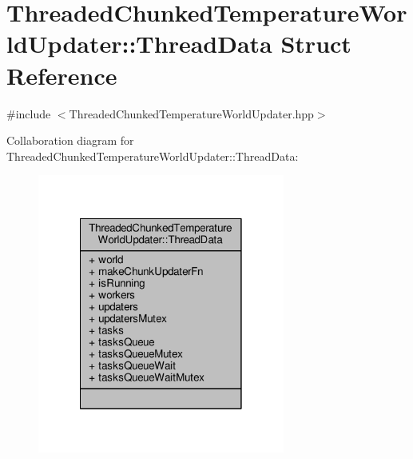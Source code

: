 \hypertarget{struct_threaded_chunked_temperature_world_updater_1_1_thread_data}{\section{Threaded\-Chunked\-Temperature\-World\-Updater\-:\-:Thread\-Data Struct Reference}
\label{struct_threaded_chunked_temperature_world_updater_1_1_thread_data}
}


{\ttfamily \#include $<$Threaded\-Chunked\-Temperature\-World\-Updater.\-hpp$>$}



Collaboration diagram for Threaded\-Chunked\-Temperature\-World\-Updater\-:\-:Thread\-Data\-:
\nopagebreak
\begin{figure}[H]
\begin{center}
\leavevmode
\includegraphics[width=230pt]{struct_threaded_chunked_temperature_world_updater_1_1_thread_data__coll__graph}
\end{center}
\end{figure}
